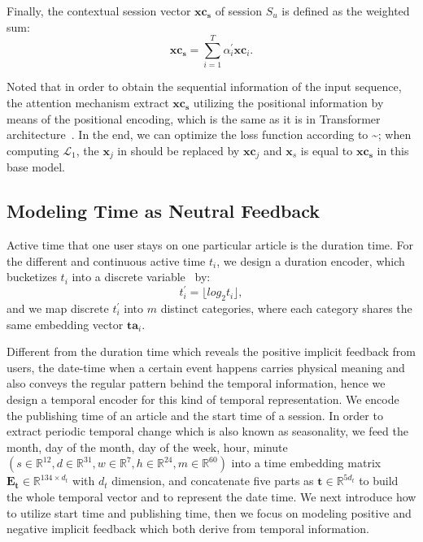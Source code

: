 Finally, the contextual session vector $\mathbf{xc_s}$ of session $S_u$ is defined as the weighted sum:
\begin{equation}
    \label{eq:final_repre}
    \mathbf{xc_s} = \sum_{i=1}^{T} \alpha_i^{\prime} \mathbf{xc}_i.
\end{equation}

Noted that in order to obtain the sequential information of the input sequence, the attention mechanism extract $\mathbf{xc_s}$ utilizing the positional information by means of the positional encoding, which is the same as it is in Transformer architecture~\cite{vaswani2017attention}. In the end, we can optimize the loss function according to \textasciitilde{}; when computing $\mathcal{L}_1$, the $\mathbf{x}_j$ in  should be replaced by $\mathbf{xc}_j$ and $\mathbf{x}_s$ is equal to $\mathbf{xc_s}$ in this base model.

\subsection{Modeling Time as Neutral Feedback}
\label{sec: temporal}
Active time that one user stays on one particular article is the duration time. For the different and continuous active time $t_i$, we design a duration encoder, which
bucketizes $t_i$ into a discrete variable~\cite{wu2020CPRS} by: 
\begin{equation}
   t_i^{\prime}=\lfloor log_2{t_i} \rfloor,
\end{equation}
and we map discrete $t_i^{\prime}$ into $m$ distinct categories, 
where each category shares the same embedding vector $\mathbf{ta}_i$.

Different from the duration time which reveals the positive implicit feedback 
from users, the date-time when a certain event happens carries physical 
meaning and also conveys the regular pattern behind the temporal information, 
hence we design a temporal encoder for this kind of temporal representation. We encode the publishing time of an article and the start time of a session. In order to extract periodic temporal change which is also known as seasonality, we feed 
the month, day of the month, day of the week, hour, minute $(s\in \mathbb{R}^{12}, d \in \mathbb{R}^{31}, w \in \mathbb{R}^7, h\in \mathbb{R}^{24}, m\in \mathbb{R}^{60})$ into a time embedding matrix $\mathbf{E_t}\in \mathbb{R}^{134 \times d_t}$ with $d_t$ dimension, and concatenate five parts as $\mathbf{t} \in \mathbb{R}^{5d_t}$ to build the whole temporal vector and to represent the date time. We next introduce how to utilize start time and publishing time, then we focus on modeling positive and negative implicit feedback which both derive from temporal information.

